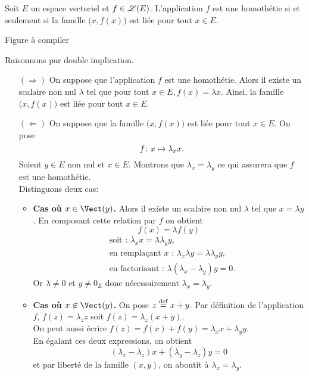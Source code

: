 \begin{prop}
    Soit $E$ un espace vectoriel et $f \in \mathscr{L}(E)$. L'application $f$ est une homothétie si et seulement si la famille $\big(x, f(x) \big)$ est liée pour tout $x \in E$.
\end{prop}

\begin{marginfigure}
    \centering
    \caption{Figure à compiler}
\end{marginfigure}

\begin{demo}
    Raisonnons par double implication. 
    \begin{itemize}
        \item[$(\Rightarrow)$] On suppose que l'application $f$ est une homothétie. Alors il existe un scalaire non nul $\lambda$ tel que pour tout $x \in E, f(x) = \lambda x$. Ainsi, la famille $\big(x, f(x) \big)$ est liée pour tout $x \in E$. 
        \item[$(\Leftarrow)$]  On suppose que la famille $\big(x, f(x) \big)$ est liée pour tout $x \in E$. On pose 
        $$f \colon x \mapsto \lambda_x x.$$
        Soient $y \in E$ non nul et $x \in E$. Montrons que $\lambda_x = \lambda_{y}$ ce qui assurera que $f$ est une homothétie. \\
        Distinguons deux cas:
        \begin{itemize}
            \item \textbf{Cas où $x \in \Vect(y)$.} Alors il existe un scalaire non nul $\lambda$ tel que $x = \lambda y$. En composant cette relation par $f$ on obtient
            $$f(x) = \lambda f(y)$$
            \begin{align*}
                &\text{soit : } \lambda_x x = \lambda \lambda_{y} y, \\
                &\text{en remplaçant $x$ : } \lambda_x \lambda y = \lambda \lambda_{y} y, \\
                &\text{en factorisant : } \lambda (\lambda_x - \lambda_{y}) y = 0.
            \end{align*}
            Or $\lambda \not= 0$ et $y \not= 0_E$ donc nécessairement $\lambda_x = \lambda_{y}$.
            \item \textbf{Cas où $x \not \in \Vect(y)$.} On pose $z \overset{\mathrm{\tiny def}}{=} x + y$. Par définition de l'application $f$, $f(z) = \lambda_z z$ soit $f(z) = \lambda_z(x + y)$. \\
            On peut aussi écrire $f(z) = f(x) + f(y) = \lambda_x x + \lambda_y y$. \\
            En égalant ces deux expressions, on obtient 
            \[
            (\lambda_x - \lambda_z) x + (\lambda_{y} - \lambda_z) y = 0
            \]
            et par liberté de la famille $(x, y)$, on aboutit à $\lambda_x = \lambda_{y}$.
        \end{itemize}
    \end{itemize}
\end{demo}
